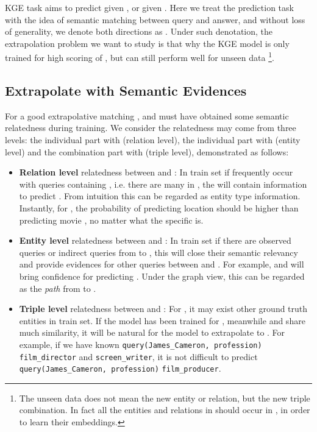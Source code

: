 \documentclass[letterpaper]{article} \usepackage{aaai22}  \usepackage{times}  \usepackage{helvet}  \usepackage{courier}  \usepackage[hyphens]{url}  \usepackage{graphicx} \urlstyle{rm} \def\UrlFont{\rm}  \usepackage{natbib}  \usepackage{caption} \DeclareCaptionStyle{ruled}{labelfont=normalfont,labelsep=colon,strut=off} \frenchspacing  \setlength{\pdfpagewidth}{8.5in}  \setlength{\pdfpageheight}{11in}  \usepackage{algorithm}
\begin{document}
KGE task aims to predict  given , or  given . 
Here we treat the prediction task with the idea of semantic matching between query and answer, and without loss of generality, we denote both directions as . 
Under such denotation, the extrapolation problem we want to study is that why the KGE model is only trained for high scoring of , but can still perform well for unseen data \footnote{The unseen data does not mean the new entity or relation, but the new triple combination. In fact all the entities and relations in  should occur in , in order to learn their embeddings.}.

\subsection{Extrapolate with Semantic Evidences}
\label{sec: SE}
For a good extrapolative matching ,  and  must have obtained some semantic relatedness during training. We consider the relatedness may come from three levels: the individual  part with  (relation level), the individual  part with  (entity level) and the combination  part with  (triple level), demonstrated as follows: 
\begin{itemize}
    \item \textbf{Relation level} relatedness between  and : In train set if  frequently occur with queries containing , i.e. there are many  in , the  will contain information to predict . From intuition this can be regarded as entity type information. Instantly, for , the probability of predicting location  should be higher than predicting movie , no matter what the specific  is.
    \item \textbf{Entity level} relatedness between  and : In train set if there are observed queries or indirect queries from  to , this will close their semantic relevancy and provide evidences for other queries between  and . 
    For example,  and  will bring confidence for predicting . Under the graph view, this can be regarded as the \textit{path} from  to . 
    \item \textbf{Triple level} relatedness between  and : For , it may exist other ground truth entities  in train set. If the model has been trained for , meanwhile  and  share much similarity, it will be natural for the model to extrapolate to . For example, if we have known \texttt{query(James\_Cameron, profession)}  \texttt{film\_director} and \texttt{screen\_writer}, it is not difficult to predict \texttt{query(James\_Cameron, profession)}  \texttt{film\_producer}.
\end{itemize}
\end{document}

